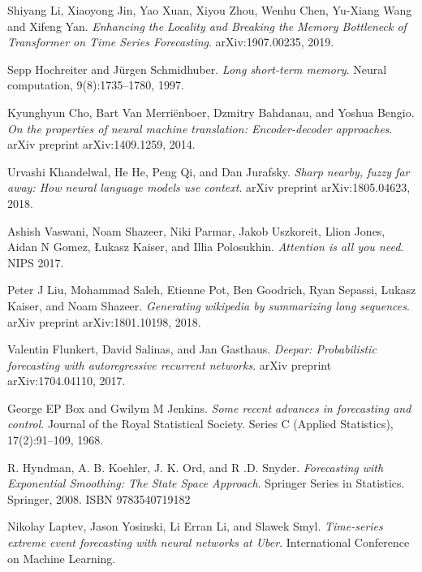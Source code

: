 \documentclass[en]{pracamgr}
\begin{document}
	
	\begin{thebibliography}{99}
		
		 Shiyang Li, Xiaoyong Jin, Yao Xuan, Xiyou Zhou, Wenhu Chen, Yu-Xiang Wang and Xifeng Yan. \textit{Enhancing the Locality and Breaking the Memory
			Bottleneck of Transformer on Time Series Forecasting}. arXiv:1907.00235, 2019.
		
		 Sepp Hochreiter and Jürgen Schmidhuber. \textit{Long short-term memory}. Neural computation, 9(8):1735–1780, 1997.
		
		 Kyunghyun Cho, Bart Van Merriënboer, Dzmitry Bahdanau, and Yoshua Bengio. \textit{On the properties of neural machine translation: Encoder-decoder approaches}. arXiv preprint arXiv:1409.1259, 2014.
		
		 Urvashi Khandelwal, He He, Peng Qi, and Dan Jurafsky. \textit{Sharp nearby, fuzzy far away: How neural language models use context}. arXiv preprint arXiv:1805.04623, 2018.
		
		 Ashish Vaswani, Noam Shazeer, Niki Parmar, Jakob Uszkoreit, Llion Jones, Aidan N Gomez, Łukasz
		Kaiser, and Illia Polosukhin. \textit{Attention is all you need}. NIPS 2017.
		
		 Peter J Liu, Mohammad Saleh, Etienne Pot, Ben Goodrich, Ryan Sepassi, Lukasz Kaiser, and Noam
		Shazeer. \textit{Generating wikipedia by summarizing long sequences}. arXiv preprint arXiv:1801.10198, 2018.
		
		 Valentin Flunkert, David Salinas, and Jan Gasthaus. \textit{Deepar: Probabilistic forecasting with autoregressive recurrent networks}. arXiv preprint arXiv:1704.04110, 2017.
		
		 George EP Box and Gwilym M Jenkins. \textit{Some recent advances in forecasting and control}. Journal of the
		Royal Statistical Society. Series C (Applied Statistics), 17(2):91–109, 1968.
		
		 R. Hyndman, A. B. Koehler, J. K. Ord, and R .D. Snyder. \textit{Forecasting with Exponential Smoothing: The State Space Approach}. Springer Series in Statistics. Springer, 2008. ISBN
		9783540719182
		
		 Nikolay Laptev, Jason Yosinski, Li Erran Li, and Slawek Smyl. \textit{Time-series extreme event forecasting with neural networks at Uber}. International Conference on Machine Learning.
		

\end{thebibliography}
\end{document}
